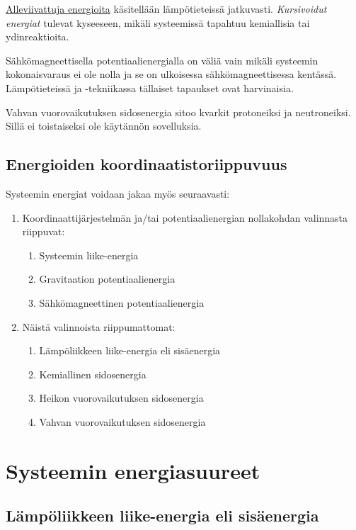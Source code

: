 \documentclass[12pt,a4paper,finnish]{book}
\begin{document}
\underline{Alleviivattuja energioita} käsitellään lämpötieteissä jatkuvasti. \textit{Kursivoidut 
energiat} tulevat kyseeseen, mikäli systeemissä tapahtuu kemiallisia tai ydinreaktioita. 

Sähkömagneettisella potentiaalienergialla on väliä vain mikäli systeemin kokonaisvaraus ei ole nolla ja 
se on ulkoisessa sähkömagneettisessa kentässä. Lämpötieteissä ja -tekniikassa tällaiset tapaukset ovat 
harvinaisia.

Vahvan vuorovaikutuksen sidosenergia sitoo kvarkit protoneiksi ja neutroneiksi. Sillä ei toistaiseksi 
ole käytännön sovelluksia.

\subsection{Energioiden koordinaatistoriippuvuus}

Systeemin energiat voidaan jakaa myös seuraavasti:

\begin{enumerate}
 \item Koordinaattijärjestelmän ja/tai potentiaalienergian nollakohdan valinnasta riippuvat:
 \begin{enumerate}
  \item Systeemin liike-energia
  \item Gravitaation potentiaalienergia
  \item Sähkömagneettinen potentiaalienergia
 \end{enumerate}
 \item Näistä valinnoista riippumattomat:
 \begin{enumerate}
  \item Lämpöliikkeen liike-energia eli sisäenergia
  \item Kemiallinen sidosenergia
  \item Heikon vuorovaikutuksen sidosenergia
  \item Vahvan vuorovaikutuksen sidosenergia
 \end{enumerate}
\end{enumerate}

\section{Systeemin energiasuureet}

\subsection{Lämpöliikkeen liike-energia eli sisäenergia}
\end{document}

